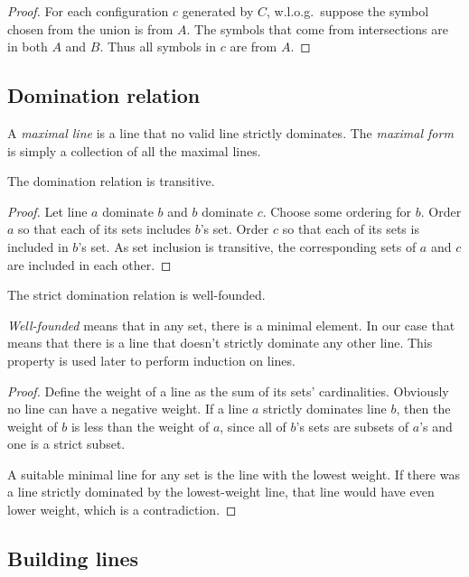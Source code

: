\documentclass[english, 12pt, a4paper, sci, a-1b, online]{aaltothesis}
\begin{document}
\begin{proof}
For each configuration $c$ generated by $C$, w.l.o.g.\ suppose the symbol chosen from the union is from $A$. The symbols that come from intersections are in both $A$ and $B$. Thus all symbols in $c$ are from $A$.
\end{proof}

\subsection{Domination relation}

A \emph{maximal line} is a line that no valid line strictly dominates. The \emph{maximal form} is simply a collection of all the maximal lines.

\begin{lemma}\label{domtrans}
The domination relation is transitive.
\end{lemma}

\begin{proof}
Let line $a$ dominate $b$ and $b$ dominate $c$. Choose some ordering for $b$. Order $a$ so that each of its sets includes $b$'s set. Order $c$ so that each of its sets is included in $b$'s set. As set inclusion is transitive, the corresponding sets of $a$ and $c$ are included in each other.
\end{proof}

\begin{lemma}\label{wfproof}
The strict domination relation is well-founded.
\end{lemma}

\emph{Well-founded} means that in any set, there is a minimal element. In our case that means that there is a line that doesn't strictly dominate any other line. This property is used later to perform induction on lines.

\begin{proof}
Define the weight of a line as the sum of its sets' cardinalities. Obviously no line can have a negative weight. If a line $a$ strictly dominates line $b$, then the weight of $b$ is less than the weight of $a$, since all of $b$'s sets are subsets of $a$'s and one is a strict subset.

A suitable minimal line for any set is the line with the lowest weight. If there was a line strictly dominated by the lowest-weight line, that line would have even lower weight, which is a contradiction.
\end{proof}

\subsection{Building lines}
\end{document}
